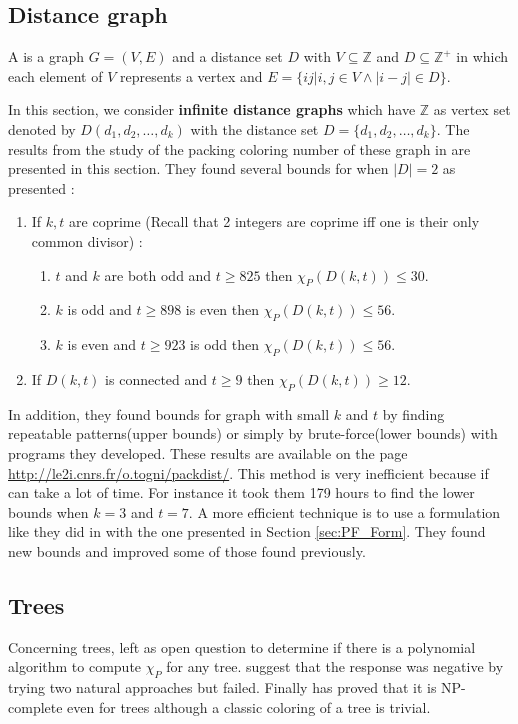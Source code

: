 \subsection{Distance graph}

\begin{mydef}
\label{def:distanceGraph}
A  is a graph $G =(V,E)$ and a distance set $D$ with $V \subseteq \mathbb{Z}$ and $D \subseteq \mathbb{Z^{+}}$ in which each element of $V$ represents a vertex and $E=\{ij | i,j \in V \land |i-j| \in D \}$.
\end{mydef}

In this section, we consider \textbf{infinite distance graphs} which have $\mathbb{Z}$ as vertex set denoted by $D(d_1,d_2,\dots,d_k)$ with the distance set $D = \{d_1,d_2,\dots,d_k\}$. The results from the study of the packing coloring number of these graph in \cite{DistanceGraph} are presented in this section. They found several bounds for when $|D|=2$ as presented :

\begin{enumerate}
\item If $k,t$ are coprime (Recall that 2 integers are coprime iff one is their only common divisor) :
\begin{enumerate}
\item $t$ and $k$ are both odd and $t \geq 825$ then $\chi_P(D(k,t)) \leq 30$.
\item $k$ is odd and $t \geq 898$ is even then $\chi_P(D(k,t)) \leq 56$.
\item $k$ is even and $t \geq 923$ is odd then $\chi_P(D(k,t)) \leq 56$.
\end{enumerate}
\item If $D(k,t)$ is connected and $t \geq 9$ then $\chi_P(D(k,t)) \geq 12$.
\end{enumerate}

In addition, they found bounds for graph with small $k$ and $t$ by finding repeatable patterns(upper bounds) or simply by brute-force(lower bounds) with programs they developed. These results are available on the page \url{http://le2i.cnrs.fr/o.togni/packdist/}. This method is very inefficient because if can take a lot of time. For instance it took them 179 hours to find the lower bounds when $k=3$ and $t=7$. A more efficient technique is to use a formulation like they did in \cite{PCModel} with the one presented in Section \ref{sec:PF_Form}. They found new bounds and improved some of those found previously.

\subsection{Trees}
\label{sec:PC_trees}
Concerning trees, \cite{broadcastchromatic} left as open question to determine if there is a polynomial algorithm to compute $\chi_P$ for any tree. \cite{PCNLatice} suggest that the response was negative by trying two natural approaches but failed. Finally \cite{PCComplexity} has proved that it is NP-complete even for trees although a classic coloring of a tree is trivial. \\

